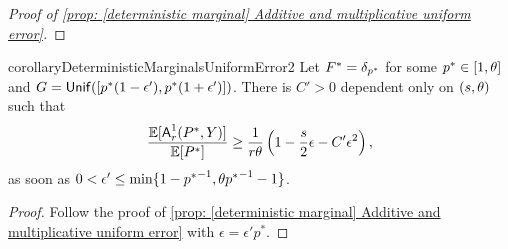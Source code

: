 \begin{proof}[{Proof of \cref{prop: [deterministic marginal] Additive and multiplicative uniform error}}]
    
\end{proof}

\begin{restatable}{corollary}{DeterministicMarginalsUniformError2}\label{cor: [deterministic marginal] multiplicative uniform error} Let $F^*=\delta_{p^*}$ for some $p^*\in[1,\theta]$ and $G=\mbox{\textup{\textsf{Unif}}}([p^*(1-\epsilon'),p^*(1+\epsilon')])$. There is $C'>0$ dependent only on $(s,\theta)$ such that
        \begin{align}
            \frac{\mathbb{E}[\mbox{\textup{\textsf{A}}}^1_r(P^*,Y)]}{\mathbb{E}[P^*]}\ge \frac{1}{r\theta}\left(1-\frac{s}2\epsilon-C'\epsilon^2\right)\label{eq: [deterministic marginal] Multiplicative uniform error PR bound},
        \end{align}
    as soon as $0<\epsilon'\le \min\{1-{p^*}^{-1},\theta{p^*}^{-1}-1\}$.
\end{restatable}

\begin{proof}
    Follow the proof of \cref{prop: [deterministic marginal] Additive and multiplicative uniform error} with $\epsilon=\epsilon'p^*$.
\end{proof}

